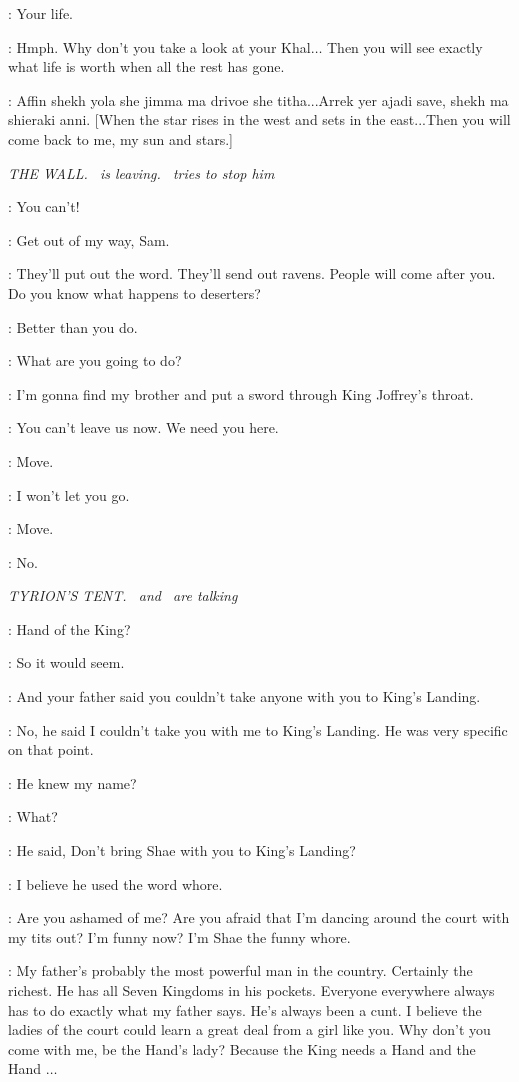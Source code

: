 \DAENERYS: Your life. 

\MIRRI: Hmph. Why don't you take a look at your Khal$\ldots$ Then you will see exactly what life is worth when all the rest has gone. 

\DAENERYS: Affin shekh yola she jimma ma drivoe she titha...Arrek yer ajadi save, shekh ma shieraki anni. [When the star rises in the west and sets in the east...Then you will come back to me, my sun and stars.]


\scene

\textit{THE WALL. \JON ~is leaving.  \SAM ~tries to stop him} 

\SAM: You can't! 

\JON: Get out of my way, Sam. 

\SAM: They'll put out the word. They'll send out ravens. People will come after you. Do you know what happens to deserters? 

\JON: Better than you do. 

\SAM: What are you going to do? 

\JON: I'm gonna find my brother and put a sword through King Joffrey's throat. 

\SAM: You can't leave us now. We need you here. 

\JON: Move. 

\SAM: I won't let you go. 

\JON: Move. 

\SAM: No. 


\scene

\textit{TYRION'S TENT. \TYRION ~and \SHAE ~are talking} 

\SHAE: Hand of the King? 

\TYRION: So it would seem. 

\SHAE: And your father said you couldn't take anyone with you to King's Landing. 

\TYRION: No, he said I couldn't take you with me to King's Landing. He was very specific on that point. 

\SHAE: He knew my name? 

\TYRION: What? 

\SHAE: He said, Don't bring Shae with you to King's Landing? 

\TYRION: I believe he used the word whore. 

\SHAE: Are you ashamed of me? Are you afraid that I'm dancing around the court with my tits out? I'm funny now? I'm Shae the funny whore. 

\TYRION: My father's probably the most powerful man in the country. Certainly the richest. He has all Seven Kingdoms in his pockets. Everyone everywhere always has to do exactly what my father says. He's always been a cunt. I believe the ladies of the court could learn a great deal from a girl like you. Why don't you come with me, be the Hand's lady? Because the King needs a Hand and the Hand $\ldots$  

